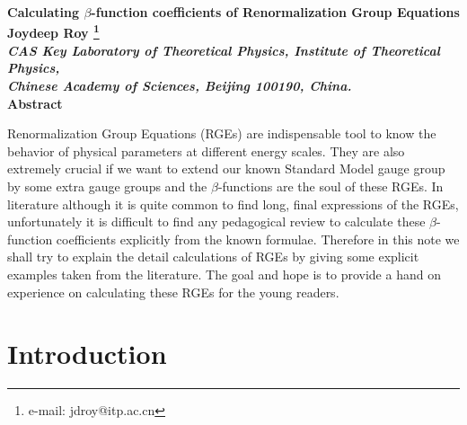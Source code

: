 \documentclass[11pt,prd,superscriptaddress,nofootinbib]{revtex4-1}
\numberwithin{equation}{section}
\def\b{\beta}
\begin{document}
\begin{titlepage}
\vspace{0.1cm}
\begin{center}
\Large\bf\boldmath Calculating $\b$-function coefficients of  Renormalization Group Equations  \unboldmath \\[2cm]

%
\setlength {\baselineskip}{0.2in} {\large
  Joydeep Roy \footnote{e-mail: jdroy@itp.ac.cn}}
  \\[5mm]
%
{\it CAS Key Laboratory of Theoretical Physics, Institute of Theoretical Physics,\\
Chinese Academy of Sciences, Beijing 100190, China.}\\[25mm]
%
{\bf Abstract}\\[5mm]
\end{center}
\setlength{\baselineskip}{0.2in} 

Renormalization Group Equations (RGEs) are indispensable tool to know the behavior of physical parameters at different energy scales. They are also extremely crucial if we want to extend our known Standard Model gauge group by some extra gauge groups and the $\b$-functions are the soul of these RGEs. In literature although it is quite common to find long, final expressions of the RGEs, unfortunately it is difficult to find any pedagogical review to calculate these $\b$-function coefficients explicitly from the known formulae. Therefore in this note we shall try to explain the detail calculations of RGEs by giving some explicit examples taken from the literature. The goal and hope is to provide a hand on experience on calculating these RGEs for the young readers.

\end{titlepage}




\section{Introduction}
\end{document}
